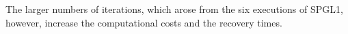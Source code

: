 The larger numbers of
iterations, which arose from
the six executions of
\ac{SPGL1}, however, increase
the computational costs and
the recovery times.
